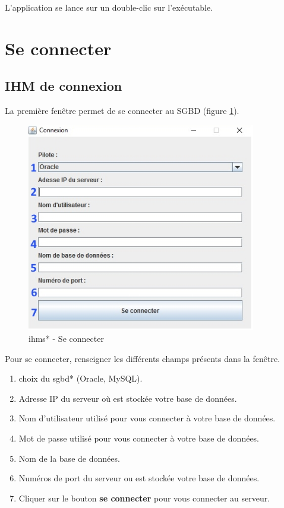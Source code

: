 L'application se lance sur un double-clic sur l'exécutable.

\section{Se connecter}
\subsection{IHM de connexion}
La première fen\^etre permet de se connecter au SGBD (figure \ref{se_connecter_gui}).
\begin{figure}[!h]
\centering
\includegraphics[width=10cm]{./images/manuel/se_connecter.jpg}
\caption{\glspl{ihm}* - Se connecter}
\label{se_connecter_gui}
\end{figure}

Pour se connecter, renseigner les différents champs présents dans la fen\^etre.

\begin{enumerate}
\item choix du \gls{sgbd}* (Oracle, MySQL).
\item Adresse IP du serveur où est stockée votre base de données.
\item Nom d'utilisateur utilisé pour vous connecter à votre base de données. 
\item Mot de passe utilisé pour vous connecter à votre base de données.
\item Nom de la base de données.
\item Numéros de port du serveur ou est stockée votre base de données.
\item Cliquer sur le bouton \textbf{se connecter} pour vous connecter au serveur.
\end{enumerate}

